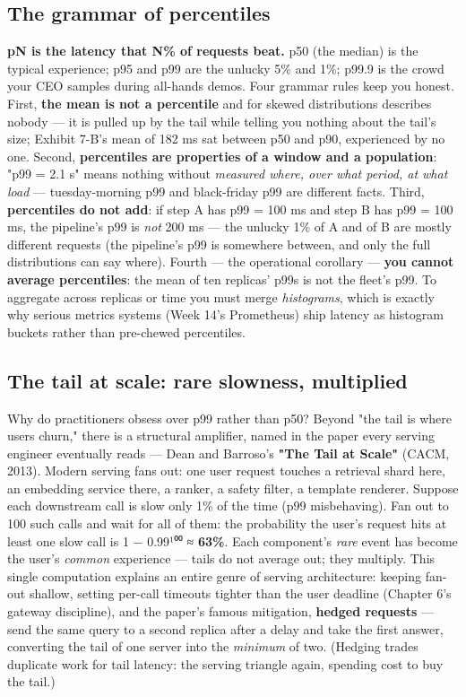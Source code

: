 \subsection*{The grammar of percentiles}

\textbf{pN is the latency that N\% of requests beat.} p50 (the median) is the typical experience; p95 and p99 are the unlucky 5\% and 1\%; p99.9 is the crowd your CEO samples during all-hands demos. Four grammar rules keep you honest. First, \textbf{the mean is not a percentile} and for skewed distributions describes nobody — it is pulled up by the tail while telling you nothing about the tail's size; Exhibit 7-B's mean of 182 ms sat between p50 and p90, experienced by no one. Second, \textbf{percentiles are properties of a window and a population}: "p99 = 2.1 s" means nothing without \textit{measured where, over what period, at what load} — tuesday-morning p99 and black-friday p99 are different facts. Third, \textbf{percentiles do not add}: if step A has p99 = 100 ms and step B has p99 = 100 ms, the pipeline's p99 is \textit{not} 200 ms — the unlucky 1\% of A and of B are mostly different requests (the pipeline's p99 is somewhere between, and only the full distributions can say where). Fourth — the operational corollary — \textbf{you cannot average percentiles}: the mean of ten replicas' p99s is not the fleet's p99. To aggregate across replicas or time you must merge \textit{histograms}, which is exactly why serious metrics systems (Week 14's Prometheus) ship latency as histogram buckets rather than pre-chewed percentiles.

\subsection*{The tail at scale: rare slowness, multiplied}

Why do practitioners obsess over p99 rather than p50? Beyond "the tail is where users churn," there is a structural amplifier, named in the paper every serving engineer eventually reads — Dean and Barroso's \textbf{"The Tail at Scale"} (CACM, 2013). Modern serving fans out: one user request touches a retrieval shard here, an embedding service there, a ranker, a safety filter, a template renderer. Suppose each downstream call is slow only 1\% of the time (p99 misbehaving). Fan out to 100 such calls and wait for all of them: the probability the user's request hits at least one slow call is 1 − 0.99¹⁰⁰ ≈ \textbf{63\%}. Each component's \textit{rare} event has become the user's \textit{common} experience — tails do not average out; they multiply. This single computation explains an entire genre of serving architecture: keeping fan-out shallow, setting per-call timeouts tighter than the user deadline (Chapter 6's gateway discipline), and the paper's famous mitigation, \textbf{hedged requests} — send the same query to a second replica after a delay and take the first answer, converting the tail of one server into the \textit{minimum} of two. (Hedging trades duplicate work for tail latency: the serving triangle again, spending cost to buy the tail.)

